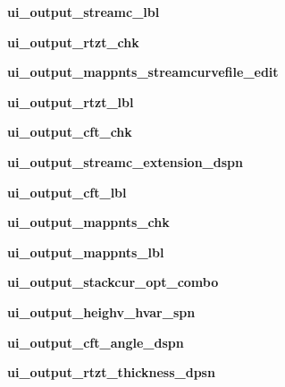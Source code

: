\begin{DoxyCompactItemize}
\hypertarget{a00075_a1436e56fad76cd38cf1f87db08b539b8}{}\label{a00075_a1436e56fad76cd38cf1f87db08b539b8} 
{\bfseries ui\+\_\+output\+\_\+streamc\+\_\+lbl}
\item 
\hypertarget{a00075_a336846c91ac57b8ab8ab0f2b5c5a0b9e}{}\label{a00075_a336846c91ac57b8ab8ab0f2b5c5a0b9e} 
{\bfseries ui\+\_\+output\+\_\+rtzt\+\_\+chk}
\item 
\hypertarget{a00075_a806b947963fcab17402d6c5b4cc16368}{}\label{a00075_a806b947963fcab17402d6c5b4cc16368} 
{\bfseries ui\+\_\+output\+\_\+mappnts\+\_\+streamcurvefile\+\_\+edit}
\item 
\hypertarget{a00075_a17ad2111dee7da23381837dc87ce9a6c}{}\label{a00075_a17ad2111dee7da23381837dc87ce9a6c} 
{\bfseries ui\+\_\+output\+\_\+rtzt\+\_\+lbl}
\item 
\hypertarget{a00075_a1b032189cdd7d3d01263d73bfd778d92}{}\label{a00075_a1b032189cdd7d3d01263d73bfd778d92} 
{\bfseries ui\+\_\+output\+\_\+cft\+\_\+chk}
\item 
\hypertarget{a00075_ae4dbdbe6b6da83089c1ae51bb6cdb1e2}{}\label{a00075_ae4dbdbe6b6da83089c1ae51bb6cdb1e2} 
{\bfseries ui\+\_\+output\+\_\+streamc\+\_\+extension\+\_\+dspn}
\item 
\hypertarget{a00075_ac2158a8a751f8d5478c20a551799d3b1}{}\label{a00075_ac2158a8a751f8d5478c20a551799d3b1} 
{\bfseries ui\+\_\+output\+\_\+cft\+\_\+lbl}
\item 
\hypertarget{a00075_afcb54ff967d6a7fc001c9714f038ab80}{}\label{a00075_afcb54ff967d6a7fc001c9714f038ab80} 
{\bfseries ui\+\_\+output\+\_\+mappnts\+\_\+chk}
\item 
\hypertarget{a00075_a96c4756f82fdfe6fa5385898c3d96a91}{}\label{a00075_a96c4756f82fdfe6fa5385898c3d96a91} 
{\bfseries ui\+\_\+output\+\_\+mappnts\+\_\+lbl}
\item 
\hypertarget{a00075_a9a81933c3dedf38f28446661eb6796fa}{}\label{a00075_a9a81933c3dedf38f28446661eb6796fa} 
{\bfseries ui\+\_\+output\+\_\+stackcur\+\_\+opt\+\_\+combo}
\item 
\hypertarget{a00075_af92fe733419818e322c45b716966440b}{}\label{a00075_af92fe733419818e322c45b716966440b} 
{\bfseries ui\+\_\+output\+\_\+heighv\+\_\+hvar\+\_\+spn}
\item 
\hypertarget{a00075_aa8751b98f2848d66d991f668a8061b50}{}\label{a00075_aa8751b98f2848d66d991f668a8061b50} 
{\bfseries ui\+\_\+output\+\_\+cft\+\_\+angle\+\_\+dspn}
\item 
\hypertarget{a00075_a0ce457bc120667aadadd3ade828c65b3}{}\label{a00075_a0ce457bc120667aadadd3ade828c65b3} 
{\bfseries ui\+\_\+output\+\_\+rtzt\+\_\+thickness\+\_\+dpsn}

\end{DoxyCompactItemize}

